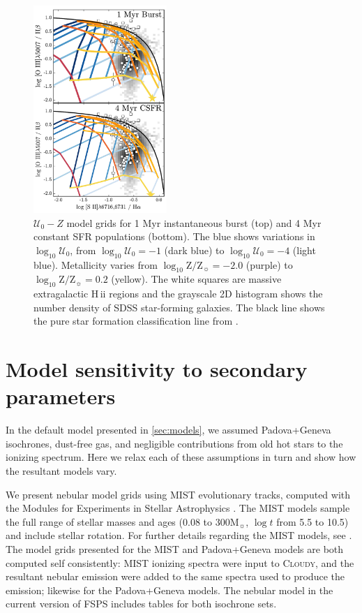 \documentclass[trackchanges, twocolumn, tighten]{aastex61}
\newcommand{\Sec}[1]{\autoref{sec:#1}}
\newcommand{\FSPS}{{\sc FSPS}\xspace}
\newcommand{\Cloudy}{\textsc{Cloudy}\xspace}
\newcommand{\logten}{\ensuremath{\log_{10}}}
\newcommand\Msun{\ensuremath{\mathrm{M_{\sun}}}}
\newcommand{\hii}{H\,{\sc ii}\xspace}
\newcommand{\logZeq}[1]{\ensuremath{\logten \mathrm{Z}/\mathrm{Z}_{\sun} = #1}}
\newcommand{\U}{\ensuremath{\mathcal{U}_{0}}}
\newcommand{\logU}{\ensuremath{\logten \mathcal{U}_0}}
\begin{document}
\begin{figure}[H!]
  \begin{centering}
    \includegraphics[width=0.45\textwidth]{f20b.pdf}
    \caption{$\U-Z$ model grids for 1 Myr instantaneous burst (top) and 4 Myr constant SFR populations (bottom). The blue shows variations in \logU{}, from $\logU{}=-1$ (dark blue) to $\logU{}=-4$ (light blue). Metallicity varies from \logZeq{-2.0} (purple) to \logZeq{0.2} (yellow). The white squares are massive extragalactic \hii regions and the grayscale 2D histogram shows the number density of SDSS star-forming galaxies. The black line shows the pure star formation classification line from \citet{Kauffmann03a}.}
    \label{fig:alt2}
  \end{centering}
\end{figure}

\section{Model sensitivity to secondary parameters}\label{sec:secondary}

In the default model presented in \Sec{models}, we assumed Padova+Geneva isochrones, dust-free gas, and negligible contributions from old hot stars to the ionizing spectrum. Here we relax each of these assumptions in turn and show how the resultant models vary.

We present nebular model grids using MIST evolutionary tracks, computed with the Modules for Experiments in Stellar Astrophysics \citep[MESA,][]{Paxton11}. The MIST models sample the full range of stellar masses and ages (0.08 to 300\Msun{}, $\log t$ from 5.5 to 10.5) and include stellar rotation. For further details regarding the MIST models, see \citet{Choi16}. The model grids presented for the MIST and Padova+Geneva models are both computed self consistently: MIST ionizing spectra were input to \Cloudy, and the resultant nebular emission were added to the same spectra used to produce the emission; likewise for the Padova+Geneva models. The nebular model in the current version of \FSPS includes tables for both isochrone sets.
\end{document}

